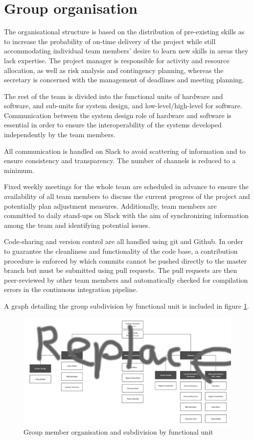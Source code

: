 \documentclass{article}
\begin{document}
\section{Group organisation}

The organisational structure is based on the distribution of pre-existing skills as to increase the probability of on-time delivery of the project while still accommodating individual team members' desire to learn new skills in areas they lack expertise. The project manager is responsible for activity and resource allocation, as well as risk analysis and contingency planning, whereas the secretary is concerned with the management of deadlines and meeting planning.

The rest of the team is divided into the functional units of hardware and software, and sub-units for system design, and low-level/high-level for software. Communication between the system design role of hardware and software is essential in order to ensure the interoperability of the systems developed independently by the team members.

All communication is handled on Slack to avoid scattering of information and to ensure consistency and transparency. The number of channels is reduced to a minimum.

Fixed weekly meetings for the whole team are scheduled in advance to ensure the availability of all team members to discuss the current progress of the project and potentially plan adjustment measures. Additionally, team members are committed to daily stand-ups on Slack with the aim of synchronizing information among the team and identifying potential issues.

Code-sharing and version control are all handled using git and Github. In order to guarantee the cleanliness and functionality of the code base, a contribution procedure is enforced by which commits cannot be pushed directly to the master branch but must be submitted using pull requests. The pull requests are then peer-reviewed by other team members and automatically checked for compilation errors in the continuous integration pipeline.

A graph detailing the group subdivision by functional unit is included in figure \ref{fig:organisation}.

\begin{figure}[h]
\vskip 5mm
\begin{center}
\centerline{\includegraphics[width=\textwidth]{figs/organisation}}
\caption{Group member organisation and subdivision by functional unit}
\label{fig:organisation}
\end{center}
\vskip -5mm
\end{figure} 


\end{document}
